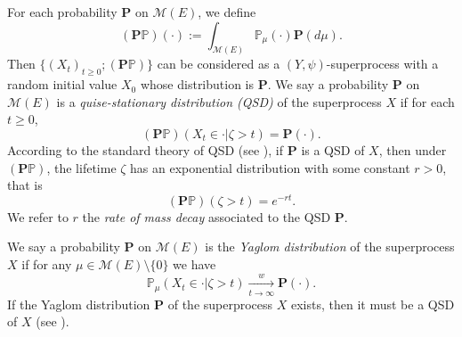 \documentclass[12pt,a4paper]{amsart}
\numberwithin{equation}{section}
\theoremstyle{plain}
\theoremstyle{definition}
\begin{document}
For each probability ${\mathbf P}$ on $\mathcal M(E)$, we define
\[
	( {\mathbf P} \mathbb P)(\cdot) := \int_{\mathcal M(E)} \mathbb P_\mu(\cdot) {\mathbf P}(d\mu).
\]
Then $\{(X_t)_{t\geq 0}; ({\mathbf P}\mathbb P)\}$ can be considered as a $(Y,\psi)$-superprocess with a random initial value $X_0$ whose distribution is ${\mathbf P}$.
We say a probability ${\mathbf P}$ on $\mathcal M(E)$ is a \emph{quise-stationary distribution (QSD)} of the superprocess $X$ if  for each $t\geq 0$,
\[
	({\mathbf P}\mathbb P)(X_t \in \cdot | \zeta > t) ={\mathbf P}(\cdot).
\]
According to the standard theory of QSD (see \cite{MeleardVillemonais2012Quasistationary}), if ${\mathbf P}$ is a QSD of $X$, then under $({\mathbf P}\mathbb P)$, the lifetime $\zeta$ has an exponential distribution with some constant $r > 0$, that is
\[
	( {\mathbf P}\mathbb P)(\zeta > t) = e^{-r t}.
\]
We refer to $r$ the \emph{rate of mass decay} associated to the QSD $\mathbf P$.

We say a probability ${\mathbf P}$ on $\mathcal M(E)$ is the \emph{Yaglom distribution} of the superprocess $X$ if for any $\mu\in \mathcal M(E)\setminus\{0\}$ we have
\[
	\mathbb P_\mu(X_t \in \cdot | \zeta > t) \xrightarrow[t\to \infty]{w} {\mathbf P}(\cdot).
\]
If the Yaglom distribution ${\mathbf P}$ of the superprocess $X$ exists, then it must be a QSD of $X$ (see \cite{MeleardVillemonais2012Quasistationary}).
\end{document}
